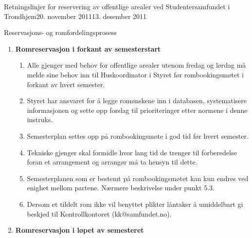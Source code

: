 \documentclass[fsbok.tex]{subfiles}
\begin{document}
\begin{instruks}{Retningslinjer for reservering av offentlige arealer
    ved Studentersamfundet i Trondhjem}{20. november 2011}{13. desember 2011}
\begin{instruksledd}{Reservasjons- og romfordelingsprosess}
        \begin{enumerate}
            \item \textbf{Romreservasjon i forkant av semesterstart}
                \begin{enumerate}
                    \item Alle gjenger med behov for offentlige arealer utenom fredag
                        og lørdag må melde sine behov inn til
                        Huskoordinator i Styret før rombookingsmøtet i forkant av hvert
                        semester.
                    \item Styret har ansvaret for å legge romønskene inn i databasen,
                        systematisere informasjonen og sette opp forslag til
                        prioriteringer etter normene i denne instruks.
                    \item Semesterplan settes opp på rombookingsmøte i god tid før
                        hvert semester.
                    \item Tekniske gjenger skal formidle hvor lang tid de trenger til
                        forberedelse foran et arrangement og arrangør må
                        ta hensyn til dette.
                    \item Semesterplanen som er bestemt på rombookingsmøtet kan kun
                        endres ved enighet mellom partene. Nærmere
                        beskrivelse under punkt 5.3.
                    \item Dersom et tildelt rom ikke vil benyttet plikter låntaker å
                        umiddelbart gi beskjed til Kontrollkontoret
                        (kk@samfundet.no).
                \end{enumerate}

            \item \textbf{Romreservasjon i løpet av semesteret}


\end{enumerate}
\end{instruksledd}
\end{instruks}
\end{document}
